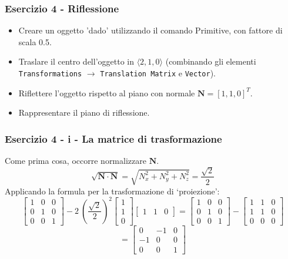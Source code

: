 \documentclass{beamer}
\begin{document}
\begin{frame}
\frametitle {Esercizio 4 - Riflessione}
\begin{itemize}
\item Creare un oggetto 'dado' utilizzando il comando Primitive, con fattore di scala 0.5.
\item Traslare il centro dell'oggetto in   $\langle 2,1,0\rangle$  (combinando gli elementi \texttt{Transformations} $\rightarrow$ \texttt{Translation Matrix} e \texttt{Vector}).  
\item Riflettere l'oggetto rispetto al piano con normale $\textbf{N}=[1,1,0]^T$.
\item Rappresentare il piano di riflessione.
\end{itemize}
\end{frame}
\begin{frame}
\frametitle {Esercizio 4 - i - La matrice di trasformazione}
Come prima cosa, occorre normalizzare $\textbf{N}$.
\begin{displaymath}
\sqrt{\mathbf{N} \cdot \mathbf{N}} =\sqrt{ N_x^2+N_y^2+N_z^2}=\frac{\sqrt{2}}{2}
\end{displaymath}
Applicando la formula per la trasformazione di `proiezione':
\begin{displaymath}
\begin{bmatrix}
1 & 0 & 0 \\
0 & 1 & 0 \\ 
0 & 0 & 1 
\end{bmatrix}
- 2~ \left(\frac{\sqrt{2}}{2}\right)^2
\begin{bmatrix}
1 \\
1 \\ 
0 
\end{bmatrix}
\begin{bmatrix}
1 & 1 &  0
\end{bmatrix}
= 
\begin{bmatrix}
1 & 0 & 0 \\
0 & 1 & 0 \\ 
0 & 0 & 1 
\end{bmatrix}
-
\begin{bmatrix}
1 & 1 & 0 \\
1 & 1 & 0 \\ 
0 & 0 & 0 
\end{bmatrix}
\end{displaymath}
{\color[rgb]{0.1,0,1}
\begin{displaymath}
=
\begin{bmatrix}
0  & -1 & 0 \\
-1 &  0 & 0 \\ 
0  &  0 & 1 
\end{bmatrix}
\end{displaymath}
}

\end{frame}
\end{document}
